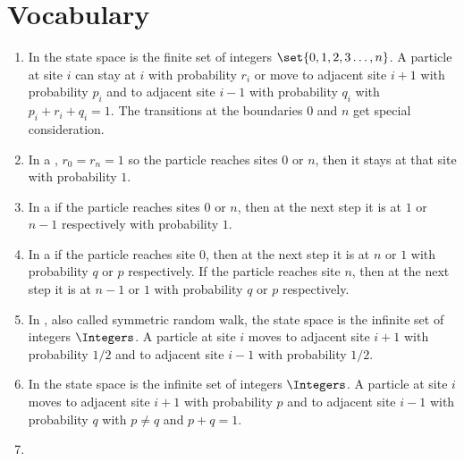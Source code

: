 \documentclass[12pt]{article}
\begin{document}
\hr

\section*{Vocabulary}
\begin{enumerate}
    \item
        In  the state space is the
        finite set of integers \( \set{0, 1, 2, 3 \dots, n} \).  A
        particle at site \( i \) can stay at \( i \) with probability \(
        r_i \) or move to adjacent site \( i+1 \) with probability \( p_i
        \) and to adjacent site \( i-1 \) with probability \( q_i \)
        with \( p_i+r_i+q_i = 1 \).  The transitions at the boundaries \(
        0 \) and \( n \) get special consideration.
    \item
        In a , \( r_0 = r_n
        = 1 \) so the particle reaches sites \( 0 \) or \( n \), then it
        stays at that site with probability \( 1 \).
    \item
        In a  if the
        particle reaches sites \( 0 \) or \( n \), then at the next step
        it is at \( 1 \) or \( n-1 \) respectively with probability \( 1
        \).
    \item
        In a  if the particle reaches
        site \( 0 \), then at the next step it is at \( n \) or \( 1 \)
        with probability \( q \) or \( p \) respectively.  If the
        particle reaches site \( n \), then at the next step it is at \(
        n-1 \) or \( 1 \) with probability \( q \) or \( p \)
        respectively.
    \item
        In , also called
        symmetric random walk,  the state space is the infinite set of
        integers \( \Integers \).  A particle at site \( i \) moves to
        adjacent site \( i+1 \) with probability \( 1/2 \) and to
        adjacent site \( i-1 \) with probability \( 1/2 \).
    \item
        In  the state space is
        the infinite set of integers \( \Integers \).  A particle at
        site \( i \) moves to adjacent site \( i+1 \) with probability \(
        p \) and to adjacent site \( i-1 \) with probability \( q \)
        with \( p \ne q \) and \( p+q = 1 \).
    \item

\end{enumerate}
\end{document}
